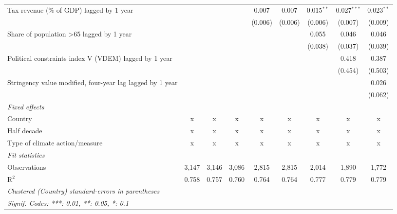 \begin{tabular}{lcccccccc}
   Tax revenue (\% of GDP) lagged by 1 year                      &         &         &         & 0.007   & 0.007   & 0.015$^{**}$   & 0.027$^{***}$  & 0.023$^{**}$\\   
                                                                 &         &         &         & (0.006) & (0.006) & (0.006)        & (0.007)        & (0.009)\\   
   Share of population >65 lagged by 1 year                      &         &         &         &         &         & 0.055          & 0.046          & 0.046\\   
                                                                 &         &         &         &         &         & (0.038)        & (0.037)        & (0.039)\\   
   Political constraints index V (VDEM) lagged by 1 year         &         &         &         &         &         &                & 0.418          & 0.387\\   
                                                                 &         &         &         &         &         &                & (0.454)        & (0.503)\\   
   Stringency value modified, four-year lag lagged by 1 year     &         &         &         &         &         &                &                & 0.026\\   
                                                                 &         &         &         &         &         &                &                & (0.062)\\   
   \emph{Fixed effects}\\
   Country                                                       & x       & x       & x       & x       & x       & x              & x              & x\\  
   Half decade                                                   & x       & x       & x       & x       & x       & x              & x              & x\\  
   Type of climate action/measure                                & x       & x       & x       & x       & x       & x              & x              & x\\  
   \midrule \emph{Fit statistics}\\
   Observations                                                  & 3,147   & 3,146   & 3,086   & 2,815   & 2,815   & 2,014          & 1,890          & 1,772\\  
   R$^2$                                                         & 0.758   & 0.757   & 0.760   & 0.764   & 0.764   & 0.777          & 0.779          & 0.779\\  
   \midrule
   \multicolumn{9}{l}{\emph{Clustered (Country) standard-errors in parentheses}}\\
   \multicolumn{9}{l}{\emph{Signif. Codes: ***: 0.01, **: 0.05, *: 0.1}}\\
\end{tabular}
\par\endgroup


